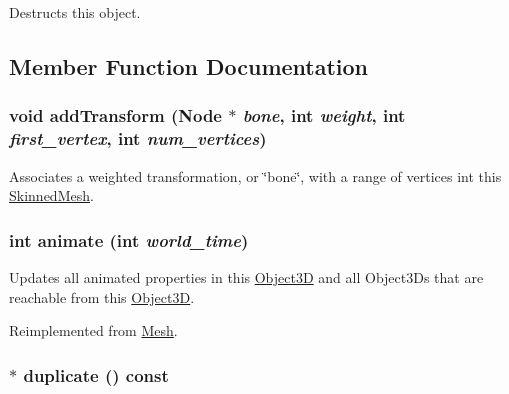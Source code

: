 Destructs this object. 

\subsection{Member Function Documentation}
\hypertarget{classm3g_1_1SkinnedMesh_05077c4ee16f87ed4163f4d7a5f4f735}{
\subsubsection[{addTransform}]{\setlength{\rightskip}{0pt plus 5cm}void addTransform ({\bf Node} $\ast$ {\em bone}, \/  int {\em weight}, \/  int {\em first\_\-vertex}, \/  int {\em num\_\-vertices})}}
\label{classm3g_1_1SkinnedMesh_05077c4ee16f87ed4163f4d7a5f4f735}


Associates a weighted transformation, or \char`\"{}bone\char`\"{}, with a range of vertices int this \hyperlink{classm3g_1_1SkinnedMesh}{SkinnedMesh}. \hypertarget{classm3g_1_1SkinnedMesh_8aad1ceab4c2a03609c8a42324ce484d}{
\subsubsection[{animate}]{\setlength{\rightskip}{0pt plus 5cm}int animate (int {\em world\_\-time})}}
\label{classm3g_1_1SkinnedMesh_8aad1ceab4c2a03609c8a42324ce484d}


Updates all animated properties in this \hyperlink{classm3g_1_1Object3D}{Object3D} and all Object3Ds that are reachable from this \hyperlink{classm3g_1_1Object3D}{Object3D}. 

Reimplemented from \hyperlink{classm3g_1_1Mesh_8aad1ceab4c2a03609c8a42324ce484d}{Mesh}.\hypertarget{classm3g_1_1SkinnedMesh_d3f422cf7656b73687d789094c7eae42}{
\subsubsection[{duplicate}]{ $\ast$ duplicate () const}}
\label{classm3g_1_1SkinnedMesh_d3f422cf7656b73687d789094c7eae42}


